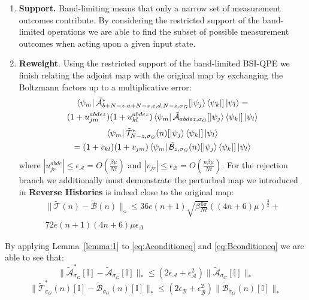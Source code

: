 \documentclass[aps,floatfix,10pt,amssymb,amsfont,amsmath,superscriptaddress,float,nofootinbib,longbibliography,nobalancelastpage,twocolumn]{revtex4-2}
\begin{document}
\begin{enumerate}
    \item \textbf{Support.} Band-limiting means that only a narrow set of measurement outcomes contribute. By considering the restricted support of the band-limited operations we are able to find the subset of possible measurement outcomes when acting upon a given input state.
    \item \textbf{Reweight}. Using the restricted support of the band-limited BSI-QPE we finish relating the adjoint map with the original map by exchanging the Boltzmann factors up to a multiplicative error:
    \begin{multline}
  \bra{\psi_m}\tilde{\mathcal{A}}^*_{b+N-z,a+N-z,e,d,N-z,\sigma_G}[\ket{\psi_j}\bra{\psi_k}]\ket{\psi_l} 
   =\\(1+u_{jm}^{abdez})(1+u_{kl}^{abdez})\bra{\psi_m}\tilde{\mathcal{A}}_{abdez,\sigma_G}[\ket{\psi_j}\bra{\psi_k}]\ket{\psi_l}
   \label{eq:Aconditioneq}
\end{multline}
\begin{multline}
    \bra{\psi_m}\tilde{\mathcal{T}}^*_{N -z,\sigma_G}(n)[\ket{\psi_j}\bra{\psi_k}]\ket{\psi_l}\\
    =(1+v_{kl})(1+v_{jm})\bra{\psi_m}\tilde{\mathcal{B}}_{z,\sigma_G}(n)[\ket{\psi_j}\bra{\psi_k}]\ket{\psi_l}
    \label{eq:Bconditioneq}
\end{multline}
    where $|u_{jr}^{abde}| \leq \epsilon_{\mathcal{A}} = O(\frac{\beta \mu}{Nt})$ and $|v_{jr}| \leq \epsilon_{\mathcal{B}} = O(\frac{n\beta \mu}{Nt})$. For the rejection branch we additionally must demonstrate the perturbed map we introduced in \textbf{Reverse Histories} is indeed close to the original map:
\begin{multline}
    \|\tilde{\mathcal{T}}(n) - \tilde{\mathcal{B}}(n)\|_{\diamond} \leq 36e(n+1)\sqrt{\beta\frac{6\pi}{Nt}}((4n+6)\mu)^{\frac{3}{2}}+\\72e(n+1)(4n+6)\mu\epsilon_{\Delta}
    \label{eq:Wdrifterrormain}
\end{multline}
\end{enumerate}
By applying Lemma~\ref{lemma:1} to \eqref{eq:Aconditioneq} and \eqref{eq:Bconditioneq} we are able to see that:
\begin{equation}
    \|\tilde{\mathcal{A}}^*_{\sigma_G}[\mathbb{I}] - \tilde{\mathcal{A}}_{\sigma_G}[\mathbb{I}]\|_* \leq (2\epsilon_{\mathcal{A}}+ \epsilon_{\mathcal{A}}^2)\|\tilde{\mathcal{A}}_{\sigma_G}[\mathbb{I}]\|_*
    \label{eq:Aoutput}
\end{equation}
\begin{equation}
    \|\tilde{\mathcal{T}}^*_{\sigma_G}(n)[\mathbb{I}] - \tilde{\mathcal{B}}_{\sigma_G}(n)[\mathbb{I}]\|_* \leq (2\epsilon_{\mathcal{B}} + \epsilon_{\mathcal{B}}^2)\|\tilde{\mathcal{B}}_{\sigma_G}(n)[\mathbb{I}]\|_*
    \label{eq:Boutput}
\end{equation}
\end{document}
